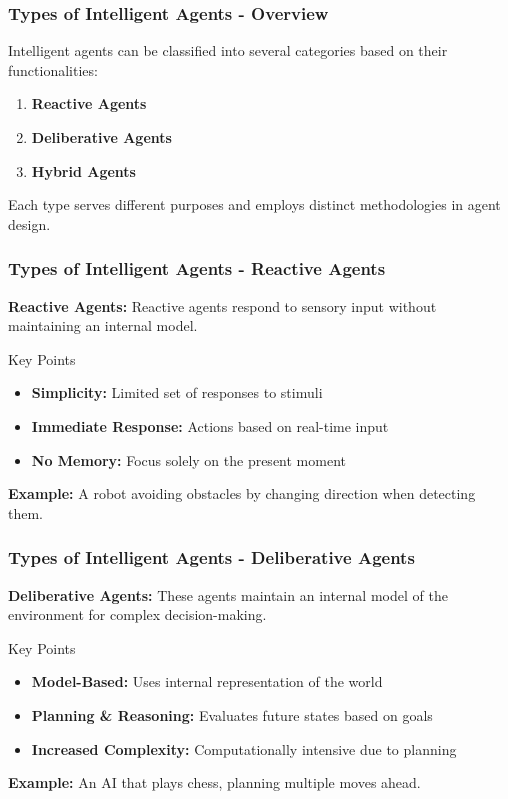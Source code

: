 \documentclass[aspectratio=169]{beamer}
\begin{document}
\begin{frame}[fragile]
    \frametitle{Types of Intelligent Agents - Overview}
    Intelligent agents can be classified into several categories based on their functionalities:

    \begin{enumerate}
        \item \textbf{Reactive Agents}
        \item \textbf{Deliberative Agents}
        \item \textbf{Hybrid Agents}
    \end{enumerate}

    Each type serves different purposes and employs distinct methodologies in agent design.
\end{frame}

\begin{frame}[fragile]
    \frametitle{Types of Intelligent Agents - Reactive Agents}
    \textbf{Reactive Agents:} 
    Reactive agents respond to sensory input without maintaining an internal model.

    \begin{block}{Key Points}
        \begin{itemize}
            \item \textbf{Simplicity:} Limited set of responses to stimuli
            \item \textbf{Immediate Response:} Actions based on real-time input
            \item \textbf{No Memory:} Focus solely on the present moment
        \end{itemize}
    \end{block}

    \textbf{Example:} A robot avoiding obstacles by changing direction when detecting them.
\end{frame}

\begin{frame}[fragile]
    \frametitle{Types of Intelligent Agents - Deliberative Agents}
    \textbf{Deliberative Agents:} 
    These agents maintain an internal model of the environment for complex decision-making.

    \begin{block}{Key Points}
        \begin{itemize}
            \item \textbf{Model-Based:} Uses internal representation of the world
            \item \textbf{Planning \& Reasoning:} Evaluates future states based on goals
            \item \textbf{Increased Complexity:} Computationally intensive due to planning
        \end{itemize}
    \end{block}

    \textbf{Example:} An AI that plays chess, planning multiple moves ahead.
\end{frame}
\end{document}
